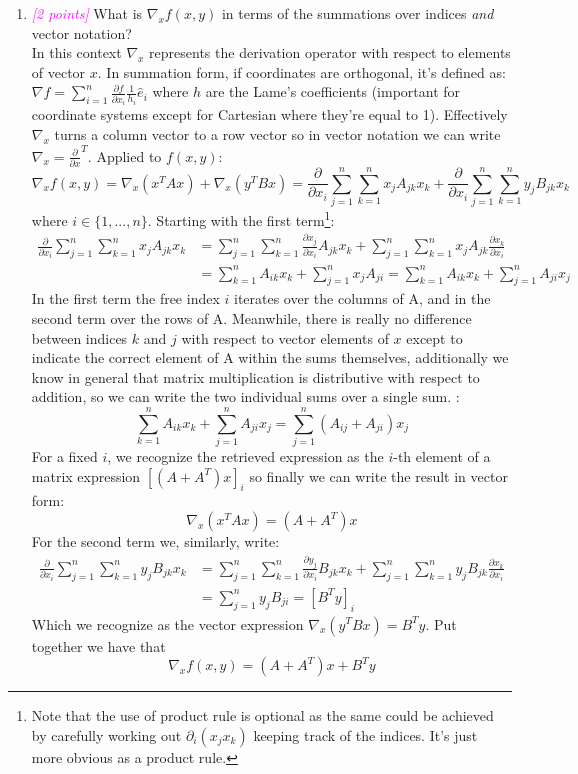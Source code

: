 \documentclass{article}
\newcommand{\1}{\mathbf{1}}
\newcommand{\points}[1]{\small\textcolor{magenta}{\emph{[#1 points]}} \normalsize}
\begin{document}
\begin{enumerate}
	\item \points{2} What is $\nabla_x f(x,y)$ in terms of the summations over indices \emph{and} vector notation?\\
	In this context $\nabla_x$ represents the derivation operator with respect to elements of vector $x$. In summation form, if coordinates are orthogonal, it's defined as: $\nabla f = \sum_{i=1}^n \frac{\partial f}{\partial x_i}\frac{1}{h_i}\hat e_i$ where $h$ are the Lame's coefficients (important for coordinate systems except for Cartesian where they're equal to 1). Effectively $\nabla_x$ turns a column vector to a row vector so in vector notation we can write $\nabla_x = \frac{\partial}{\partial x}^T$. Applied to $f(x,y)$:
	$$ \nabla_x f(x, y) = \nabla_x (x^TAx) + \nabla_x (y^TBx) = 
	\frac{\partial }{\partial x_i}\sum_{j=1}^n\sum_{k=1}^n x_jA_{jk}x_k 
	+
	\frac{\partial}{\partial x_i} \sum_{j=1}^n \sum_{k=1}^n y_jB_{jk}x_k $$
	where $i \in \{1,...,n\}$. Starting with the first term\footnote{Note that the use of product rule is optional as the same could be achieved by carefully working out $\partial_i(x_j x_k)$ keeping track of the indices. It's just more obvious as a product rule.}:
	\begin{align*}
	  \frac{\partial}{\partial x_i}\sum_{j=1}^n\sum_{k=1}^n x_jA_{jk}x_k &= 
	  \sum_{j=1}^n\sum_{k=1}^n \frac{\partial x_j}{\partial x_i}A_{jk}x_k +
	  \sum_{j=1}^n\sum_{k=1}^n x_jA_{jk}\frac{\partial x_k}{\partial x_i} \\
	  &= \sum_{k=1}^n A_{ik}x_k + \sum_{j=1}^n x_jA_{ji} = \sum_{k=1}^n A_{ik}x_k + \sum_{j=1}^n A_{ji}x_j
	\end{align*}
	In the first term the free index $i$ iterates over the columns of A, and in the second term over the rows of A. Meanwhile, there is really no difference between indices $k$ and $j$ with respect to vector elements of $x$ except to indicate the correct element of A within the sums themselves, additionally we know in general that matrix multiplication is distributive with respect to addition, so we can write the two individual sums over a single sum. :
	$$ \sum_{k=1}^n A_{ik}x_k + \sum_{j=1}^n A_{ji}x_j = \sum_{j=1}^n (A_{ij} + A_{ji})x_j$$
	For a fixed $i$, we recognize the retrieved expression as the $i$-th element of a matrix expression $[(A+A^T)x]_i$ so finally we can write the result in vector form:
	$$\nabla_x (x^TAx) = (A+A^T)x$$
	For the second term we, similarly, write:
	\begin{align*}
	  \frac{\partial}{\partial x_i}\sum_{j=1}^n\sum_{k=1}^n y_jB_{jk}x_k &= 
	  \sum_{j=1}^n\sum_{k=1}^n \frac{\partial y_j}{\partial x_i}B_{jk}x_k +
	  \sum_{j=1}^n\sum_{k=1}^n y_jB_{jk}\frac{\partial x_k}{\partial x_i} \\
	  &= \sum_{j=1}^n y_jB_{ji}   = \left[B^Ty\right]_i
	\end{align*}
	Which we recognize as the vector expression $\nabla_x (y^TBx) = B^Ty$. Put together we have that 
	$$\nabla_x f(x,y) = (A+A^T)x + B^Ty$$
	

\end{enumerate}
\end{document}
